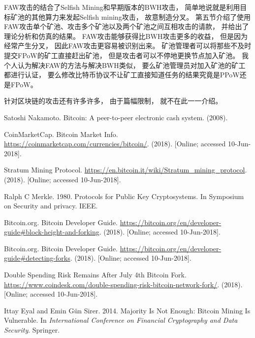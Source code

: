 \documentclass[a4paper, 11pt]{article}
\begin{document}
\begin{CJK*}{UTF8}{gbsn}
    FAW攻击的结合了Selfish Mining和早期版本的BWH攻击，
    简单地说就是利用目标矿池的其他算力来发起Selfish mining攻击，
    故意制造分叉。
    第五节介绍了使用FAW攻击单个矿池、攻击多个矿池以及两个矿池之间互相攻击的请款，
    并给出了理论分析和仿真的结果。
    FAW攻击能够获得比BWH攻击更多的收益，
    但是因为经常产生分叉，
    因此FAW攻击更容易被识别出来。
    矿池管理者可以将那些不及时提交FPoW的矿工直接赶出矿池，
    但是攻击者可以不停地更换节点加入矿池。
    我个人认为解决FAW的方法与解决BWH类似，
    要么矿池管理员对加入矿池的矿工都进行认证，
    要么修改比特币协议不让矿工直接知道任务的结果究竟是PPoW还是FPoW。

    针对区块链的攻击还有许多许多，
    由于篇幅限制，
    就不在此一一介绍。

    \clearpage

    \begin{thebibliography}{8}

    Satoshi Nakamoto. Bitcoin: A peer-to-peer electronic cash system. (2008).

    CoinMarketCap. Bitcoin Market Info. 
    \url{https://coinmarketcap.com/currencies/bitcoin/}. 
    (2018). [Online; accessed 10-Jun-2018].


    Stratum Mining Protocol. 
    \url{https://en.bitcoin.it/wiki/Stratum_mining_protocol}.
    (2018). [Online; accessed 10-Jun-2018].
    
    
    Ralph C Merkle. 1980. Protocols for Public Key Cryptosystems. In Symposium on
    Security and privacy. IEEE.

    Bitcoin.org. Bitcoin Developer Guide. 
    \url{https://bitcoin.org/en/developer-guide#block-height-and-forking}.
    (2018). [Online; accessed 10-Jun-2018].


    Bitcoin.org. Bitcoin Developer Guide. 
    \url{https://bitcoin.org/en/developer-guide#detecting-forks}.
    (2018). [Online; accessed 10-Jun-2018].

    Double Spending Risk Remains After July 4th Bitcoin Fork.
    \url{https://www.coindesk.com/double-spending-risk-bitcoin-network-fork/}. 
    (2018). [Online; accessed 10-Jun-2018].

    Ittay Eyal and Emin Gün Sirer. 2014. Majority Is Not Enough: Bitcoin Mining
    Is Vulnerable. 
    In \textit{International Conference on Financial Cryptography and Data
    Security}. Springer.


\end{thebibliography}
\end{CJK*}
\end{document}
